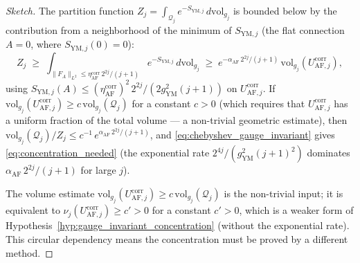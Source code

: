 \begin{proof}[Sketch]
The partition function $Z_{j}=\int_{\mathcal{Q}_{j}}
e^{-S_{\mathrm{YM},j}}\,d\mathrm{vol}_{g_{j}}$ is bounded below
by the contribution from a neighborhood of the minimum of
$S_{\mathrm{YM},j}$ (the flat connection $A=0$, where
$S_{\mathrm{YM},j}(0)=0$):
\begin{equation*}
  Z_{j}
  \;\ge\;\int_{\|F_{A}\|_{L^{2}}\le\eta_{\mathrm{AF}}^{\mathrm{corr}}\,
  2^{2j}/(j+1)}
  e^{-S_{\mathrm{YM},j}}\,d\mathrm{vol}_{g_{j}}
  \;\ge\;e^{-\alpha_{\mathrm{AF}}\,2^{2j}/(j+1)}\,
  \mathrm{vol}_{g_{j}}(U_{\mathrm{AF},j}^{\mathrm{corr}}),
\end{equation*}
using $S_{\mathrm{YM},j}(A)\le(\eta_{\mathrm{AF}}^{\mathrm{corr}})^{
\mathrm{2}}\,2^{2j}/(2g_{\mathrm{YM}}^{2}(j+1))$ on
$U_{\mathrm{AF},j}^{\mathrm{corr}}$. If
$\mathrm{vol}_{g_{j}}(U_{\mathrm{AF},j}^{\mathrm{corr}})\ge
c\,\mathrm{vol}_{g_{j}}(\mathcal{Q}_{j})$ for a constant $c>0$
(which requires that $U_{\mathrm{AF},j}^{\mathrm{corr}}$ has a
uniform fraction of the total volume --- a non-trivial geometric
estimate), then
$\mathrm{vol}_{g_{j}}(\mathcal{Q}_{j})/Z_{j}\le
c^{-1}\,e^{\alpha_{\mathrm{AF}}\,2^{2j}/(j+1)}$, and
\eqref{eq:chebyshev_gauge_invariant} gives
\eqref{eq:concentration_needed} (the exponential rate
$2^{4j}/(g_{\mathrm{YM}}^{2}(j+1)^{2})$ dominates
$\alpha_{\mathrm{AF}}\,2^{2j}/(j+1)$ for large $j$).

The volume estimate
$\mathrm{vol}_{g_{j}}(U_{\mathrm{AF},j}^{\mathrm{corr}})\ge
c\,\mathrm{vol}_{g_{j}}(\mathcal{Q}_{j})$ is the non-trivial
input; it is equivalent to
$\nu_{j}(U_{\mathrm{AF},j}^{\mathrm{corr}})\ge c'>0$ for a
constant $c'>0$, which is a weaker form of
Hypothesis~\ref{hyp:gauge_invariant_concentration} (without the
exponential rate). This circular dependency means the
concentration must be proved by a different method.
\end{proof}

